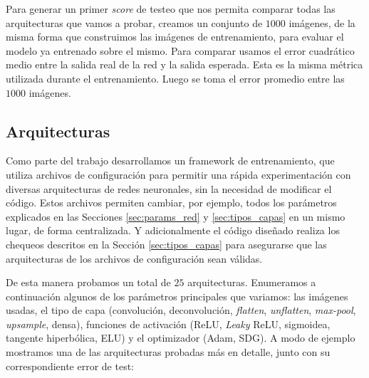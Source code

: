 Para generar un primer \emph{score} de testeo que nos permita comparar todas las arquitecturas que vamos a probar, creamos un conjunto de $1000$ imágenes, de la misma forma que construimos las imágenes de entrenamiento, para evaluar el modelo ya entrenado sobre el mismo. Para comparar usamos el error cuadrático medio entre la salida real de la red y la salida esperada. Esta es la misma métrica utilizada durante el entrenamiento. Luego se toma el error promedio entre las $1000$ imágenes.

\subsection{Arquitecturas}

Como parte del trabajo desarrollamos un framework de entrenamiento, que utiliza archivos de configuración para permitir una rápida experimentación con diversas arquitecturas de redes neuronales, sin la necesidad de modificar el código. Estos archivos permiten cambiar, por ejemplo, todos los parámetros explicados en las Secciones \ref{sec:params_red} y \ref{sec:tipos_capas} en un mismo lugar, de forma centralizada. Y adicionalmente el código diseñado realiza los chequeos descritos en la Sección \ref{sec:tipos_capas} para asegurarse que las arquitecturas de los archivos de configuración sean válidas.

De esta manera probamos un total de $25$ arquitecturas. Enumeramos a continuación algunos de los parámetros principales que variamos: las imágenes usadas, el tipo de capa (convolución, deconvolución, \emph{flatten}, \emph{unflatten}, \emph{max-pool}, \emph{upsample}, densa), funciones de activación (ReLU, \emph{Leaky} ReLU, sigmoidea, tangente hiperbólica, ELU) y el optimizador (Adam, SDG). A modo de ejemplo mostramos una de las arquitecturas probadas más en detalle, junto con su correspondiente error de test:

